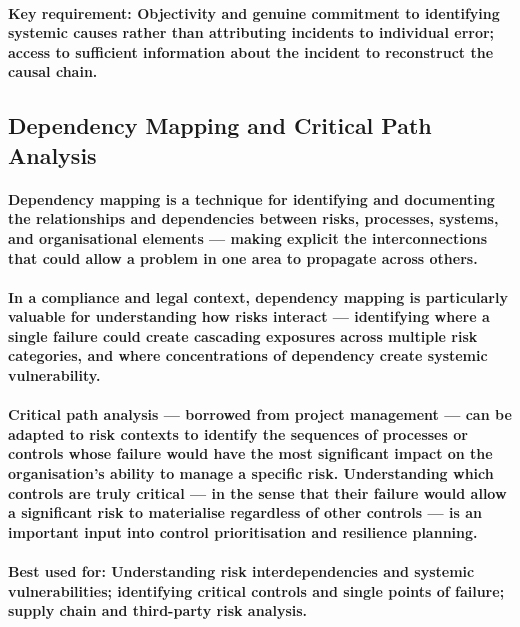 \paragraph{\textbf{Key requirement}: Objectivity and genuine commitment to identifying systemic causes rather than attributing incidents to individual error; access to sufficient information about the incident to reconstruct the causal chain.}

\subsection{Dependency Mapping and Critical Path Analysis}
\paragraph{\textbf{Dependency mapping} is a technique for identifying and documenting the relationships and dependencies between risks, processes, systems, and organisational elements — making explicit the interconnections that could allow a problem in one area to propagate across others.}
\paragraph{In a compliance and legal context, dependency mapping is particularly valuable for understanding how risks interact — identifying where a single failure could create cascading exposures across multiple risk categories, and where concentrations of dependency create systemic vulnerability.}
\paragraph{\textbf{Critical path analysis} — borrowed from project management — can be adapted to risk contexts to identify the sequences of processes or controls whose failure would have the most significant impact on the organisation's ability to manage a specific risk. Understanding which controls are truly critical — in the sense that their failure would allow a significant risk to materialise regardless of other controls — is an important input into control prioritisation and resilience planning.}
\paragraph{\textbf{Best used for}: Understanding risk interdependencies and systemic vulnerabilities; identifying critical controls and single points of failure; supply chain and third-party risk analysis.}
